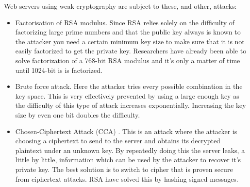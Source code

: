 \documentclass[a4paper, 12pt]{article}
\begin{document}
Web servers using weak cryptography are subject to these, and other, attacks:
\begin{itemize}
\item Factorisation of RSA modulus. Since RSA relies solely on the difficulty of factorizing large prime numbers and that the public key always is known to the attacker you need a certain minimum key size to make sure that it is not easily factorized to get the private key. Researchers have already been able to solve factorization of a 768-bit RSA modulus \cite{tolv} and it’s only a matter of time until 1024-bit is is factorized.
\item Brute force attack. Here the attacker tries every possible combination in the key space. This is very effectively prevented by using a large enough key as the difficulty of this type of attack increases exponentially. Increasing the key size by even one bit doubles the difficulty.
\item Chosen-Ciphertext Attack (CCA) \cite{tretten}. This is an attack where the attacker is choosing a ciphertext to send to the server and obtains its decrypted plaintext under an unknown key. By repeatedly doing this the server leaks, a little by little, information which can be used by the attacker to recover it’s private key. The best solution is to switch to cipher that is proven secure from ciphertext attacks. RSA have solved this by hashing signed messages.
\end{itemize}
\end{document}
